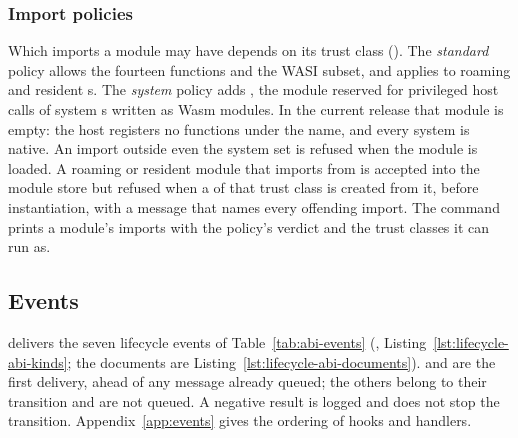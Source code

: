 \subsubsection{Import policies}

Which imports a module may have depends on its trust class
(). The \emph{standard} policy allows the
fourteen  functions and the WASI subset, and applies to
roaming and resident \paglet{}s. The \emph{system} policy adds
,
the module reserved for privileged host calls of system \paglet{}s written
as Wasm modules. In the current release that module is empty: the host
registers no functions under the name, and every system \paglet{} is
native. An import outside even the system set is refused when the module
is loaded. A roaming or resident module that imports from
 is accepted into the module store but refused when a
\paglet{} of that trust class is created from it, before instantiation,
with a message that names every offending import. The command
 prints a module's imports with the
policy's verdict and the trust classes it can run as.

\subsection{Events}\label{sec:abi-events}

 delivers the seven lifecycle
events of Table~\ref{tab:abi-events} (,
Listing~\ref{lst:lifecycle-abi-kinds}; the documents are
Listing~\ref{lst:lifecycle-abi-documents}).  and
 are the first delivery, ahead of any message already queued;
the others belong to their transition and are not queued. A negative
result is logged and does not stop the transition.
Appendix~\ref{app:events} gives the ordering of hooks and handlers.

